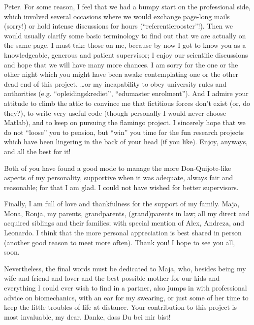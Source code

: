 Peter.
For some reason, I feel that we had a bumpy start on the professional side, which involved several occasions where we would exchange page-long mails (sorry!) or hold intense discussions for hours (``referentierooster''!).
Then we would usually clarify some basic terminology to find out that we are actually on the same page.
I must take those on me, because by now I got to know you as a knowledgeable, generous and patient supervisor; I enjoy our scientific discussions and hope that we will have many more chances.
I am sorry for the one or the other night which you might have been awake contemplating one or the other dead end of this project.
\ldots{}or my incapability to obey university rules and authorities (e.g. ``opleidingskrediet'', ``edumaster enrolment'').
And I admire your attitude to climb the attic to convince me that fictitious forces don't exist (or, do they?), to write very useful code (though personally I would never choose Matlab), and to keep on pursuing the flamingo project.
I sincerely hope that we do not ``loose'' you to pension, but ``win'' you time for the fun research projects which have been lingering in the back of your head (if you like).
Enjoy, anyways, and all the best for it!

Both of you have found a good mode to manage the more Don-Quijote-like aspects of my personality, supportive when it was adequate, always fair and reasonable; for that I am glad.
I could not have wished for better supervisors.



\newpage
Finally, I am full of love and thankfulness for the support of my family.
Maja, Mona, Ronja, my parents, grandparents, (grand)parents in law; all my direct and acquired siblings and their families; with special mention of Alex, Andreza, and Leonardo.
I think that the more personal appreciation is best shared in person (another good reason to meet more often).
Thank you!
I hope to see you all, soon.

Nevertheless, the final words must be dedicated to Maja, who, besides being my wife and friend and lover and the best possible mother for our kids and everything I could ever wish to find in a partner, also jumps in with professional advice on biomechanics, with an ear for my swearing, or just some of her time to keep the little troubles of life at distance.
Your contribution to this project is most invaluable, my dear.
Danke, dass Du bei mir bist!
